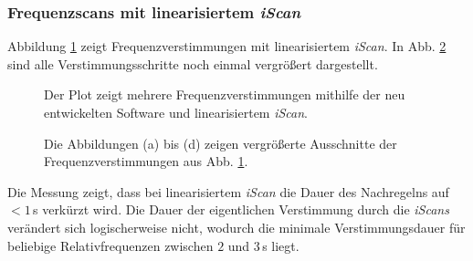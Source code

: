 \subsubsection{Frequenzscans mit linearisiertem
\textit{iScan}}\label{subsubsec:frequenz_scans_lineares_iScan}
Abbildung \ref{fig:laserscan_LUT-kalibriert} zeigt
Frequenzverstimmungen mit linearisiertem \textit{iScan}. In Abb.
\ref{fig:laserscan_LUT-kalibriert_zoom} sind alle Verstimmungsschritte noch
einmal vergrößert dargestellt.
\begin{figure}[h]
	 	\centering
	 	\footnotesize
 		
		\caption[Frequenzscan, linearisiertes \textit{iScan}]{Der Plot zeigt mehrere
		Frequenzverstimmungen mithilfe der neu entwickelten Software und
		linearisiertem \textit{iScan}.}
		\label{fig:laserscan_LUT-kalibriert}
\end{figure}
\begin{figure}[hp]
 	\centering
 	\footnotesize
	\caption[Frequenzscan, linearisisiertes \textit{iScan}, vergrößert]{Die
	Abbildungen (a) bis (d) zeigen vergrößerte Ausschnitte der
	Frequenzverstimmungen aus Abb. \ref{fig:laserscan_LUT-kalibriert}.}
	\label{fig:laserscan_LUT-kalibriert_zoom}
\end{figure}
Die Messung zeigt, dass bei linearisiertem \textit{iScan} die Dauer des
Nachregelns auf $<1\,$s verkürzt wird. Die Dauer der eigentlichen
Verstimmung durch die \textit{iScans} verändert sich logischerweise nicht,
wodurch die minimale Verstimmungsdauer für beliebige Relativfrequenzen zwischen
$2$ und $3\,$s liegt.

